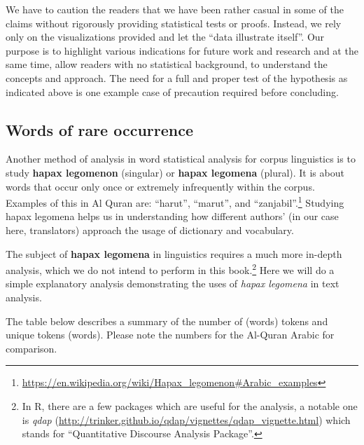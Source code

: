 \documentclass[
]{article}
\begin{document}
We have to caution the readers that we have been rather casual in some of the claims without rigorously providing statistical tests or proofs. Instead, we rely only on the visualizations provided and let the ``data illustrate itself''. Our purpose is to highlight various indications for future work and research and at the same time, allow readers with no statistical background, to understand the concepts and approach. The need for a full and proper test of the hypothesis as indicated above is one example case of precaution required before concluding.

\hypertarget{words-of-rare-occurrence}{%
\subsection{Words of rare occurrence}\label{words-of-rare-occurrence}}

Another method of analysis in word statistical analysis for corpus linguistics is to study \textbf{hapax legomenon} (singular) or \textbf{hapax legomena} (plural). It is about words that occur only once or extremely infrequently within the corpus. Examples of this in Al Quran are: ``harut'', ``marut'', and ``zanjabil''.\footnote{\url{https://en.wikipedia.org/wiki/Hapax_legomenon\#Arabic_examples}} Studying hapax legomena helps us in understanding how different authors' (in our case here, translators) approach the usage of dictionary and vocabulary.

The subject of \textbf{hapax legomena} in linguistics requires a much more in-depth analysis, which we do not intend to perform in this book.\footnote{In R, there are a few packages which are useful for the analysis, a notable one is \emph{qdap} (\url{http://trinker.github.io/qdap/vignettes/qdap_vignette.html}) which stands for ``Quantitative Discourse Analysis Package''.} Here we will do a simple explanatory analysis demonstrating the uses of \emph{hapax legomena} in text analysis.

The table below describes a summary of the number of (words) tokens and unique tokens (words). Please note the numbers for the Al-Quran Arabic for comparison.
\end{document}
